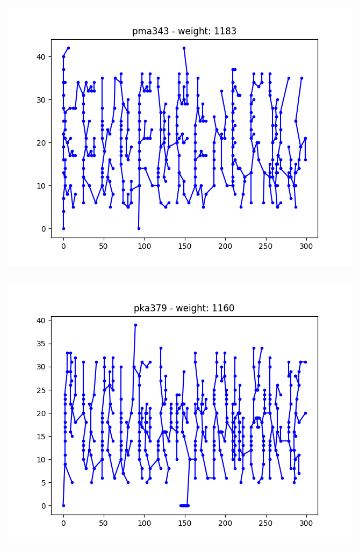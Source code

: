 \documentclass{article}
\def\v{0.4}
\begin{document}
\begin{figure}[h!]
\begin{subfigure}[b]{\v\linewidth}
	\end{subfigure}
	\begin{subfigure}[b]{\v\linewidth}
		\includegraphics[width=\linewidth]{graphs/MST_pma343.png}
	\end{subfigure}
	\begin{subfigure}[b]{\v\linewidth}
		\includegraphics[width=\linewidth]{graphs/MST_pka379.png}
	\end{subfigure}
	\begin{subfigure}[b]{\v\linewidth}

\end{subfigure}
\end{figure}
\end{document}
